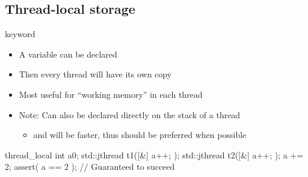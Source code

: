 \subsection[TLS]{Thread-local storage}

\begin{frame}[fragile]
  \begin{block}{ keyword}
    \begin{itemize}
      \item A variable can be declared 
      \item Then every thread will have its own copy
      \item Most useful for ``working memory'' in each thread
      \item Note: Can also be declared directly on the stack of a thread
      \begin{itemize}
        \item and will be faster, thus should be preferred when possible
      \end{itemize}
    \end{itemize}
  \end{block}
  \begin{exampleblock}{}
    \begin{cppcode*}{}
      thread_local int a{0};
      {
        std::jthread t1([&] { a++; });
        std::jthread t2([&] { a++; });
        a += 2;
      }
      assert( a == 2 ); // Guaranteed to succeed
    \end{cppcode*}
  \end{exampleblock}
\end{frame}
